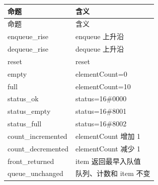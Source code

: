 \begin{longtable}{L{3.3cm}L{10.0cm}}

\toprule

命题 & 含义\\

\midrule

\endfirsthead

\toprule

命题 & 含义\\

\midrule

\endhead

{\ttfamily enqueue\_rise} & enqueue 上升沿\\

{\ttfamily dequeue\_rise} & dequeue 上升沿\\

{\ttfamily reset} & reset\\

{\ttfamily empty} & elementCount=0\\

{\ttfamily full} & elementCount=10\\

{\ttfamily status\_ok} & status=16\#0000\\

{\ttfamily status\_empty} & status=16\#8001\\

{\ttfamily status\_full} & status=16\#8002\\

{\ttfamily count\_incremented} & elementCount 增加 1\\

{\ttfamily count\_decremented} & elementCount 减少 1\\

{\ttfamily front\_returned} & item 返回最早入队值\\

{\ttfamily queue\_unchanged} & 队列、计数和 item 不变\\

\bottomrule

\end{longtable}


